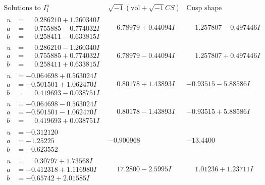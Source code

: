 \documentclass[1p]{elsarticle_modified}
\theoremstyle{definition}
\newcommand{\I}{\sqrt{-1}}
\begin{document}
$$\begin{array}{c|c|c}  
\text{Solutions to }I^u_{1}& \I (\text{vol} + \sqrt{-1}CS) & \text{Cusp shape}\\
 \hline 
\begin{aligned}
u &= \phantom{-}0.286210 + 1.260340 I \\
a &= \phantom{-}0.755885 - 0.774032 I \\
b &= \phantom{-}0.258411 - 0.633815 I\end{aligned}
 & \phantom{-}6.78979 + 0.44094 I & \phantom{-}1.257807 - 0.497446 I \\ \hline\begin{aligned}
u &= \phantom{-}0.286210 - 1.260340 I \\
a &= \phantom{-}0.755885 + 0.774032 I \\
b &= \phantom{-}0.258411 + 0.633815 I\end{aligned}
 & \phantom{-}6.78979 - 0.44094 I & \phantom{-}1.257807 + 0.497446 I \\ \hline\begin{aligned}
u &= -0.064698 + 0.563024 I \\
a &= -0.501501 + 1.062470 I \\
b &= \phantom{-}0.419693 - 0.038751 I\end{aligned}
 & \phantom{-}0.80178 + 1.43893 I & -0.93515 - 5.88586 I \\ \hline\begin{aligned}
u &= -0.064698 - 0.563024 I \\
a &= -0.501501 - 1.062470 I \\
b &= \phantom{-}0.419693 + 0.038751 I\end{aligned}
 & \phantom{-}0.80178 - 1.43893 I & -0.93515 + 5.88586 I \\ \hline\begin{aligned}
u &= -0.312120\phantom{ +0.000000I} \\
a &= -1.25225\phantom{ +0.000000I} \\
b &= -0.623552\phantom{ +0.000000I}\end{aligned}
 & -0.900968\phantom{ +0.000000I} & -13.4400\phantom{ +0.000000I} \\ \hline\begin{aligned}
u &= \phantom{-}0.30797 + 1.73568 I \\
a &= -0.412318 + 1.116980 I \\
b &= -0.65742 + 2.01585 I\end{aligned}
 & \phantom{-}17.2800 - 2.5995 I & \phantom{-}1.01236 + 1.23711 I \\ \hline\begin{aligned}

\end{aligned}
\end{array}$$
\end{document}
